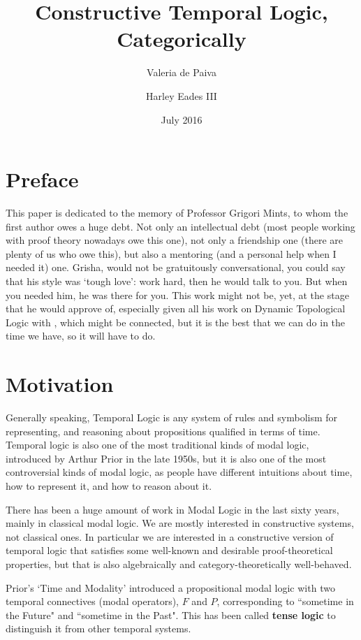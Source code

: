 \documentclass{article}
\title{Constructive Temporal Logic, Categorically}
\author{Valeria de Paiva \and Harley Eades III}
\date{July 2016}
\begin{document}
\maketitle

\section*{Preface}
This paper is dedicated to the memory of Professor Grigori Mints, to whom the first author owes a huge debt. Not only an intellectual debt (most people working with proof theory nowadays owe this one), not only a friendship one (there are plenty of us who owe this), but also a mentoring (and a personal help when I needed it)  one. Grisha,  would not be gratuitously conversational, you could say that his style was `tough love':  work hard, then  he would talk to you. But when you needed him, he was there for you. This work might not be, yet, at the stage that he would approve of, especially given all his work on Dynamic Topological Logic with \cite{kremer2005}, which might be connected, but it is the best that we can do in the time we have, so it  will have to do. 

\section{Motivation}
Generally speaking, Temporal Logic is any system of rules and
symbolism for representing, and reasoning about propositions qualified
in terms of time.  Temporal logic is also one of the most traditional
kinds of modal logic, introduced by Arthur Prior in the late 1950s,
but it is also one of the most controversial kinds of modal logic, as
people have different intuitions about time, how to represent it, and
how to reason about it.

There has been a huge amount of work in Modal Logic in the last sixty
years, mainly in classical modal logic. We are mostly interested
in constructive systems, not classical ones. In particular we are interested in a
constructive version of temporal logic that satisfies some well-known
and desirable proof-theoretical properties, but that is also
algebraically and category-theoretically {well-behaved}.

Prior's `Time and Modality' \cite{prior1957} introduced a propositional modal logic
with two temporal connectives (modal operators), $F$ and $P$,
corresponding to ``sometime in the {F}uture" and ``sometime in the {P}ast". This has been called \textbf{tense logic} to distinguish it from other temporal systems.
\end{document}
